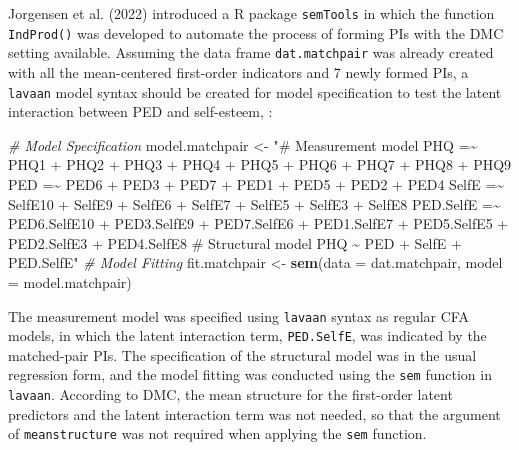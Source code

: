 \documentclass[
  man]{apa7}
\newenvironment{Shaded}{\begin{snugshade}}{\end{snugshade}}
\newcommand{\AttributeTok}[1]{\textcolor[rgb]{0.13,0.29,0.53}{#1}}
\newcommand{\CommentTok}[1]{\textcolor[rgb]{0.56,0.35,0.01}{\textit{#1}}}
\newcommand{\FunctionTok}[1]{\textcolor[rgb]{0.13,0.29,0.53}{\textbf{#1}}}
\newcommand{\NormalTok}[1]{#1}
\newcommand{\OtherTok}[1]{\textcolor[rgb]{0.56,0.35,0.01}{#1}}
\newcommand{\StringTok}[1]{\textcolor[rgb]{0.31,0.60,0.02}{#1}}
\begin{document}
Jorgensen et al. (2022) introduced a R package \texttt{semTools} in which the function \texttt{IndProd()} was developed to automate the process of forming PIs with the DMC setting available. Assuming the data frame \texttt{dat.matchpair} was already created with all the mean-centered first-order indicators and 7 newly formed PIs, a \texttt{lavaan} model syntax should be created for model specification to test the latent interaction between PED and self-esteem, :

\begin{Shaded}
\begin{Highlighting}[]
\CommentTok{\# Model Specification}
\NormalTok{model.matchpair }\OtherTok{\textless{}{-}} \StringTok{"\# Measurement model}
\StringTok{                      PHQ =\textasciitilde{} PHQ1 + PHQ2 + PHQ3 + PHQ4 + PHQ5 + }
\StringTok{                             PHQ6 + PHQ7 + PHQ8 + PHQ9}
\StringTok{                      PED =\textasciitilde{} PED6 + PED3 + PED7 + PED1 + }
\StringTok{                             PED5 + PED2 + PED4}
\StringTok{                      SelfE =\textasciitilde{} SelfE10 + SelfE9 + SelfE6 + SelfE7 + }
\StringTok{                               SelfE5 + SelfE3 + SelfE8}
\StringTok{                      PED.SelfE =\textasciitilde{} PED6.SelfE10 + PED3.SelfE9 + PED7.SelfE6 + }
\StringTok{                                   PED1.SelfE7 + PED5.SelfE5 + PED2.SelfE3 + }
\StringTok{                                   PED4.SelfE8}
\StringTok{                    \# Structural model}
\StringTok{                      PHQ \textasciitilde{} PED + SelfE + PED.SelfE"}
\CommentTok{\# Model Fitting}
\NormalTok{fit.matchpair }\OtherTok{\textless{}{-}} \FunctionTok{sem}\NormalTok{(}\AttributeTok{data =}\NormalTok{ dat.matchpair,}
                     \AttributeTok{model =}\NormalTok{ model.matchpair)}
\end{Highlighting}
\end{Shaded}

The measurement model was specified using \texttt{lavaan} syntax as regular CFA models, in which the latent interaction term, \texttt{PED.SelfE}, was indicated by the matched-pair PIs. The specification of the structural model was in the usual regression form, and the model fitting was conducted using the \texttt{sem} function in \texttt{lavaan}. According to DMC, the mean structure for the first-order latent predictors and the latent interaction term was not needed, so that the argument of \texttt{meanstructure} was not required when applying the \texttt{sem} function.
\end{document}
